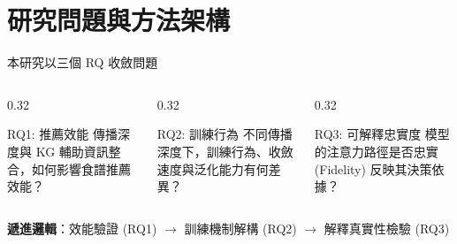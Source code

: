 \documentclass[aspectratio=169, 10pt]{beamer}
\begin{document}
\section{研究問題與方法架構}

\begin{frame}{本研究以三個 RQ 收斂問題}
  \begin{columns}[T]
    \begin{column}{0.32\textwidth}
      \begin{block}{RQ1: 推薦效能}
        傳播深度與 KG 輔助資訊整合，如何影響食譜推薦效能？
      \end{block}
    \end{column}
    \begin{column}{0.32\textwidth}
      \begin{block}{RQ2: 訓練行為}
        不同傳播深度下，訓練行為、收斂速度與泛化能力有何差異？
      \end{block}
    \end{column}
    \begin{column}{0.32\textwidth}
      \begin{block}{RQ3: 可解釋忠實度}
        模型的注意力路徑是否忠實 (Fidelity) 反映其決策依據？
      \end{block}
    \end{column}
  \end{columns}
  
  \vspace{0.6cm}
  \centering
  \textbf{遞進邏輯}：效能驗證 (RQ1) $\longrightarrow$ 訓練機制解構 (RQ2) $\longrightarrow$ 解釋真實性檢驗 (RQ3)
\end{frame}
\end{document}
